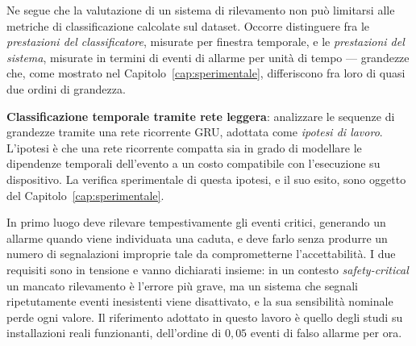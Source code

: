 Ne segue che la valutazione di un sistema di rilevamento non può limitarsi alle
metriche di classificazione calcolate sul dataset. Occorre distinguere fra le
\emph{prestazioni del classificatore}, misurate per finestra temporale, e le
\emph{prestazioni del sistema}, misurate in termini di eventi di allarme per
unità di tempo — grandezze che, come mostrato nel
Capitolo~\ref{cap:sperimentale}, differiscono fra loro di quasi due ordini di
grandezza.


%
%

\item \textbf{Classificazione temporale tramite rete leggera}: analizzare le
sequenze di grandezze tramite una rete ricorrente GRU, adottata come
\emph{ipotesi di lavoro}. L'ipotesi è che una rete ricorrente compatta sia in
grado di modellare le dipendenze temporali dell'evento a un costo compatibile
con l'esecuzione su dispositivo. La verifica sperimentale di questa ipotesi, e
il suo esito, sono oggetto del Capitolo~\ref{cap:sperimentale}.


%
%

\item In primo luogo deve rilevare tempestivamente gli eventi critici,
generando un allarme quando viene individuata una caduta, e deve farlo senza
produrre un numero di segnalazioni improprie tale da comprometterne
l'accettabilità. I due requisiti sono in tensione e vanno dichiarati insieme:
in un contesto \emph{safety-critical} un mancato rilevamento è l'errore più
grave, ma un sistema che segnali ripetutamente eventi inesistenti viene
disattivato, e la sua sensibilità nominale perde ogni valore. Il riferimento
adottato in questo lavoro è quello degli studi su installazioni reali
funzionanti, dell'ordine di $0{,}05$ eventi di falso allarme per ora.



